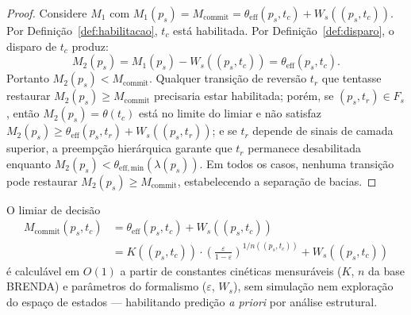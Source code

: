 \begin{proof}
Considere $M_1$ com $M_1(p_s) = M_{\text{commit}} = \theta_{\mathrm{eff}}(p_s,t_c) + W_s((p_s,t_c))$.
Por Definição~\ref{def:habilitacao}, $t_c$ está habilitada. Por
Definição~\ref{def:disparo}, o disparo de $t_c$ produz:
\[
M_2(p_s) = M_1(p_s) - W_s((p_s,t_c)) = \theta_{\mathrm{eff}}(p_s,t_c).
\]
Portanto $M_2(p_s) < M_{\text{commit}}$. Qualquer transição de reversão $t_r$
que tentasse restaurar $M_2(p_s) \geq M_{\text{commit}}$ precisaria estar
habilitada; porém, se $(p_s, t_r) \in F_s$, então $M_2(p_s) = \theta(t_c)$
está no limite do limiar e não satisfaz
$M_2(p_s) \geq \theta_{\mathrm{eff}}(p_s,t_r) + W_s((p_s, t_r))$;
e se $t_r$ depende de sinais de camada superior, a preempção hierárquica garante
que $t_r$ permanece desabilitada enquanto
$M_2(p_s) < \theta_{\mathrm{eff,min}}(\lambda(p_s))$.
Em todos os casos, nenhuma transição pode restaurar $M_2(p_s) \geq M_{\text{commit}}$,
estabelecendo a separação de bacias.
\end{proof}

\begin{corollary}
O limiar de decisão
\begin{align*}
  M_{\text{commit}}(p_s, t_c)
    &= \theta_{\mathrm{eff}}(p_s,t_c) + W_s((p_s,t_c)) \\
    &= K((p_s,t_c)) \cdot
       \left(\frac{\varepsilon}{1 - \varepsilon}\right)^{\!1/n((p_s,t_c))}
       + W_s((p_s,t_c))
\end{align*}
é calculável em $O(1)$ a partir de constantes cinéticas mensuráveis
($K$, $n$ da base BRENDA) e parâmetros do formalismo ($\varepsilon$, $W_s$),
sem simulação nem exploração do espaço de estados --- habilitando predição
\textit{a priori} por análise estrutural.
\end{corollary}

